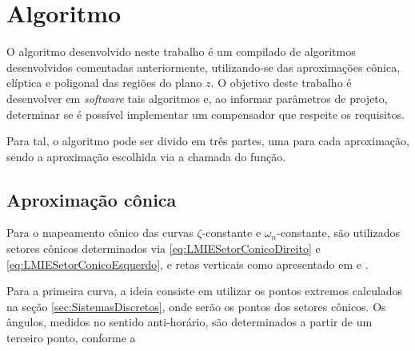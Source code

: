 \chapter{Algoritmo}

O algoritmo desenvolvido neste trabalho é um compilado de algoritmos desenvolvidos comentadas anteriormente, utilizando-se das aproximações cônica, elíptica e poligonal das regiões do plano $z$. O objetivo deste trabalho é desenvolver em \emph{software} tais algoritmos e, ao informar parâmetros de projeto, determinar se é possível implementar um compensador que respeite os requisitos.

Para tal, o algoritmo pode ser divido em três partes, uma para cada aproximação, sendo a aproximação escolhida via a chamada do função.

\section{Aproximação cônica}

Para o mapeamento cônico das curvas $\zeta$-constante e $\omega_n$-constante, são utilizados setores cônicos determinados via \eqref{eq:LMIESetorConicoDireito} e \eqref{eq:LMIESetorConicoEsquerdo}, e retas verticais como apresentado em \cite{WISNIEWSKI2017} e \cite{CHIQUETO2021}.

Para a primeira curva, a ideia consiste em utilizar os pontos extremos calculados na seção \ref{sec:SistemasDiscretos}, onde serão os pontos dos setores cônicos. Os ângulos, medidos no sentido anti-horário, são determinados a partir de um terceiro ponto, conforme a

\begin{figure}[!ht]
  \centering
  \begin{subfigure}[t]{0.4\columnwidth}
      
      \caption{}
      \label{subfig:AproximacaoConicaZeta}
  \end{subfigure}
  \begin{subfigure}[t]{0.4\columnwidth}
      
      \caption{}
      \label{subfig:AproximacaoConicaWn}
  \end{subfigure}
  \caption{}
  \label{fig:AproximacoesConica}
\end{figure}

